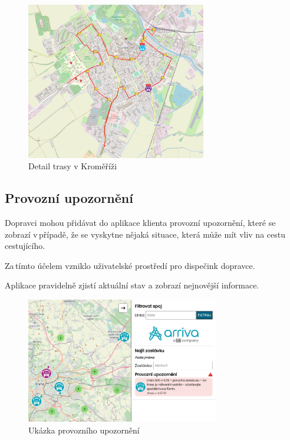 \begin{figure}[H]
    \centering
    \includegraphics[width=0.7\textwidth]{images/krom_line_6.png}
    \caption{Detail trasy v Kroměříži}
    \label{trasa}
\end{figure}

\subsection{Provozní upozornění}
Dopravci mohou přidávat do aplikace klienta provozní upozornění, které se zobrazí v\,případě, že se vyskytne nějaká situace, která může mít vliv na cestu cestujícího.\par
Za\,tímto účelem vzniklo uživatelské prostředí pro dispečink dopravce.

Aplikace pravidelně zjistí aktuální stav a zobrazí nejnovější informace.

\par
\begin{figure}[H]
    \centering
    \includegraphics[width=0.75\textwidth]{images/global_arriva_event.png}
    \caption{Ukázka provozního upozornění}
    \label{upozorneni}
\end{figure}
